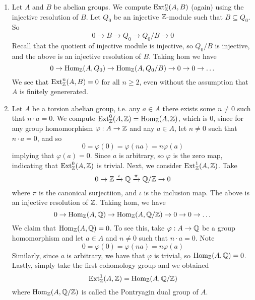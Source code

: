 \begin{ex}
    \hfill

    \begin{enumerate}
        \item Let $A$ and $B$ be abelian groups. We compute $\operatorname{Ext}_{\mathbb Z}^n(A,B)$ (again) using the injective resolution of $B$. Let $Q_0$ be an injective ${\mathbb Z}$-module such that $B\subseteq Q_0$. So
        \[0 \to B\to Q_0 \to Q_0/B \to 0\]
        Recall that the quotient of injective module is injective, so $Q_0/B$ is injective, and the above is an injective resolution of $B$. Taking hom we have 
        \[0 \to \operatorname{Hom}_{\mathbb Z}(A,Q_0) \to \operatorname{Hom}_{\mathbb Z}(A, Q_0/B) \to 0 \to 0 \to \dots\]
        We see that $\operatorname{Ext}_{\mathbb Z}^n(A,B)=0$ for all $n\geq 2$, even without the assumption that $A$ is finitely genererated.
        \item Let $A$ be a torsion abelian group, i.e. any $a\in A$ there exists some $n\neq 0$ such that $n\cdot a = 0$. We compute $\operatorname{Ext}_{\mathbb Z}^0(A,{\mathbb Z}) = \operatorname{Hom}_{\mathbb Z}(A,{\mathbb Z})$, which is $0$, since for any group homomorphism $\varphi:A\to {\mathbb Z}$ and any $a\in A$, let $n\neq 0$ such that $n\cdot a = 0$, and so 
        \[0 = \varphi(0) = \varphi(na) = n\varphi(a)\]
        implying that $\varphi(a)=0$. Since $a$ is arbitrary, so $\varphi$ is the zero map, indicating that $\operatorname{Ext}_{\mathbb Z}^0(A,{\mathbb Z})$ is trivial. Next, we consider $\operatorname{Ext}_{\mathbb Z}^1(A,{\mathbb Z})$. Take 
        \[0 \to {\mathbb Z} \xrightarrow{\iota} {\mathbb Q} \xrightarrow{\pi} {\mathbb Q}/{\mathbb Z} \to 0\]
        where $\pi$ is the canonical surjectiion, and $\iota$ is the inclusion map. The above is an injective resolution of ${\mathbb Z}$. Taking hom, we have 
        \[0 \to \operatorname{Hom}_{\mathbb Z}(A,{\mathbb Q})\to \operatorname{Hom}_{\mathbb Z}(A, {\mathbb Q}/{\mathbb Z}) \to 0 \to 0 \to \dots\]
        We claim that $\operatorname{Hom}_{\mathbb Z}(A,{\mathbb Q})=0$. To see this, take $\varphi:A\to {\mathbb Q}$ be a group homomorphism and let $a\in A$ and $n\neq 0$ such that $n\cdot a = 0$. Note
        \[0 = \varphi(0) = \varphi(na) = n\varphi(a)\]
        Similarly, since $a$ is arbitrary, we have that $\varphi$ is trivial, so $\operatorname{Hom}_{\mathbb Z}(A,{\mathbb Q})=0$. Lastly, simply take the first cohomology group and we obtained
        \[\operatorname{Ext}_{\mathbb Z}^1 (A,{\mathbb Z}) = \operatorname{Hom}_{\mathbb Z}(A,{\mathbb Q}/{\mathbb Z})\]
        where $\operatorname{Hom}_{\mathbb Z}(A,{\mathbb Q}/{\mathbb Z})$ is called the Pontryagin dual group of $A$.
    \end{enumerate}
\end{ex}

\medskip

